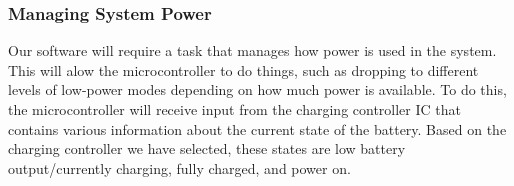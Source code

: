 \subsubsection{Managing System Power}
Our software will require a task that manages how power is used in the system. This will alow the microcontroller to do things, such as dropping to different levels of low-power modes depending on how much power is available. To do this, the microcontroller will receive input from the charging controller IC that contains various information about the current state of the battery. Based on the charging controller we have selected, these states are low battery output/currently charging, fully charged, and power on.
